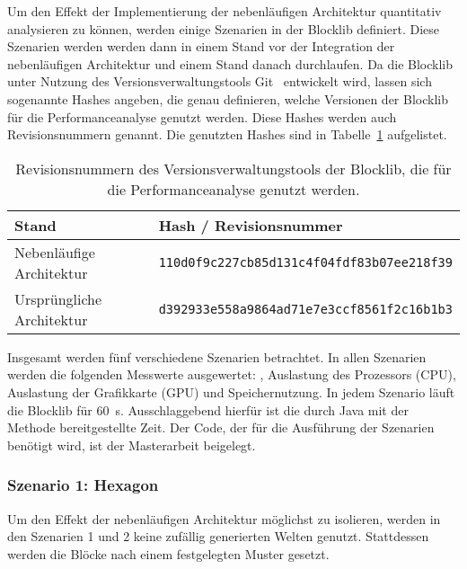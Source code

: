Um den Effekt der Implementierung der nebenläufigen Architektur quantitativ analysieren zu können, werden einige Szenarien in der Blocklib definiert. Diese Szenarien werden werden dann in einem Stand vor der Integration der nebenläufigen Architektur und einem Stand danach durchlaufen. Da die Blocklib unter Nutzung des Versionsverwaltungstools Git~\cite{Chacon2014} entwickelt wird, lassen sich sogenannte Hashes angeben, die genau definieren, welche Versionen der Blocklib für die Performanceanalyse genutzt werden. Diese Hashes werden auch Revisionsnummern genannt. Die genutzten Hashes sind in Tabelle~\ref{tab:perfHash} aufgelistet.
\begin{table}
	\centering
	\begin{tabular}{ll}
		\toprule
		Stand & Hash / Revisionsnummer \\
		\midrule
		Nebenläufige Architektur & \texttt{110d0f9c227cb85d131c4f04fdf83b07ee218f39}\\
		Ursprüngliche Architektur & \texttt{d392933e558a9864ad71e7e3ccf8561f2c16b1b3} \\
		\bottomrule
	\end{tabular}
	\caption{Revisionsnummern des Versionsverwaltungstools der Blocklib, die für die Performanceanalyse genutzt werden.}\label{tab:perfHash}
\end{table}

Insgesamt werden fünf verschiedene Szenarien betrachtet. In allen Szenarien werden die folgenden Messwerte ausgewertet: \si{\fps}, Auslastung des Prozessors (CPU), Auslastung der Grafikkarte (GPU) und Speichernutzung. In jedem Szenario läuft die Blocklib für \SI{60}{\second}. Ausschlaggebend hierfür ist die durch Java mit der Methode  bereitgestellte Zeit. Der Code, der für die Ausführung der Szenarien benötigt wird, ist der Masterarbeit beigelegt.

\subsubsection{Szenario 1: Hexagon}
Um den Effekt der nebenläufigen Architektur möglichst zu isolieren, werden in den Szenarien 1 und 2 keine zufällig generierten Welten genutzt. Stattdessen werden die Blöcke nach einem festgelegten Muster gesetzt.

